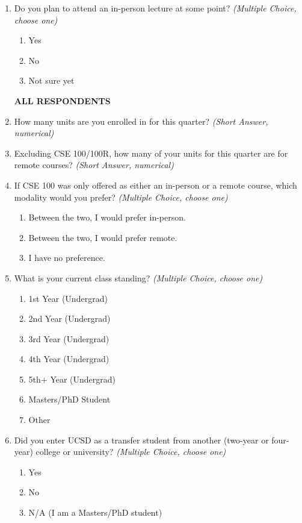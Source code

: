 \begin{enumerate}
    \item Do you plan to attend an in-person lecture at some point? \textit{(Multiple Choice, choose one)}
    \begin{enumerate}
        \item Yes
        \item No
        \item Not sure yet
    \end{enumerate}

\noindent \textbf{ALL RESPONDENTS}

    \item How many units are you enrolled in for this quarter? \textit{(Short Answer, numerical)}

    \item Excluding CSE 100/100R, how many of your units for this quarter are for remote courses? \textit{(Short Answer, numerical)}

    \item If CSE 100 was only offered as either an in-person or a remote course, which modality would you prefer? \textit{(Multiple Choice, choose one)}
    \begin{enumerate}
        \item Between the two, I would prefer in-person.
        \item Between the two, I would prefer remote.
        \item I have no preference.
    \end{enumerate}

    \item What is your current class standing? \textit{(Multiple Choice, choose one)}
    \begin{enumerate}
        \item 1st Year (Undergrad)
        \item 2nd Year (Undergrad)
        \item 3rd Year (Undergrad)
        \item 4th Year (Undergrad)
        \item 5th+ Year (Undergrad)
        \item Masters/PhD Student
        \item Other
    \end{enumerate}

    \item Did you enter UCSD as a transfer student from another (two-year or four-year) college or university? \textit{(Multiple Choice, choose one)}
    \begin{enumerate}
        \item Yes
        \item No
        \item N/A (I am a Masters/PhD student)
    \end{enumerate}


\end{enumerate}
